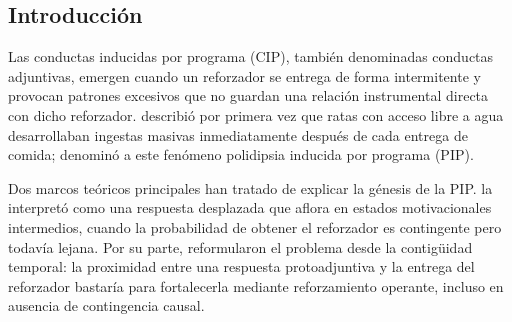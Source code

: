 \documentclass[12pt,a4paper]{article}
\begin{document}
\begin{multicols}{2}

\section{Introducción}

Las conductas inducidas por programa (CIP), también denominadas conductas adjuntivas, emergen cuando un reforzador se entrega de forma intermitente y provocan patrones excesivos que no guardan una relación instrumental directa con dicho reforzador. \citet{Falk1961} describió por primera vez que ratas con acceso libre a agua desarrollaban ingestas masivas inmediatamente después de cada entrega de comida; denominó a este fenómeno polidipsia inducida por programa (PIP).

Dos marcos teóricos principales han tratado de explicar la génesis de la PIP. \citet{Staddon1977} la interpretó como una respuesta desplazada que aflora en estados motivacionales intermedios, cuando la probabilidad de obtener el reforzador es contingente pero todavía lejana. Por su parte, \citet{Killeen2013} reformularon el problema desde la contigüidad temporal: la proximidad entre una respuesta protoadjuntiva y la entrega del reforzador bastaría para fortalecerla mediante reforzamiento operante, incluso en ausencia de contingencia causal.


\end{multicols}
\end{document}
